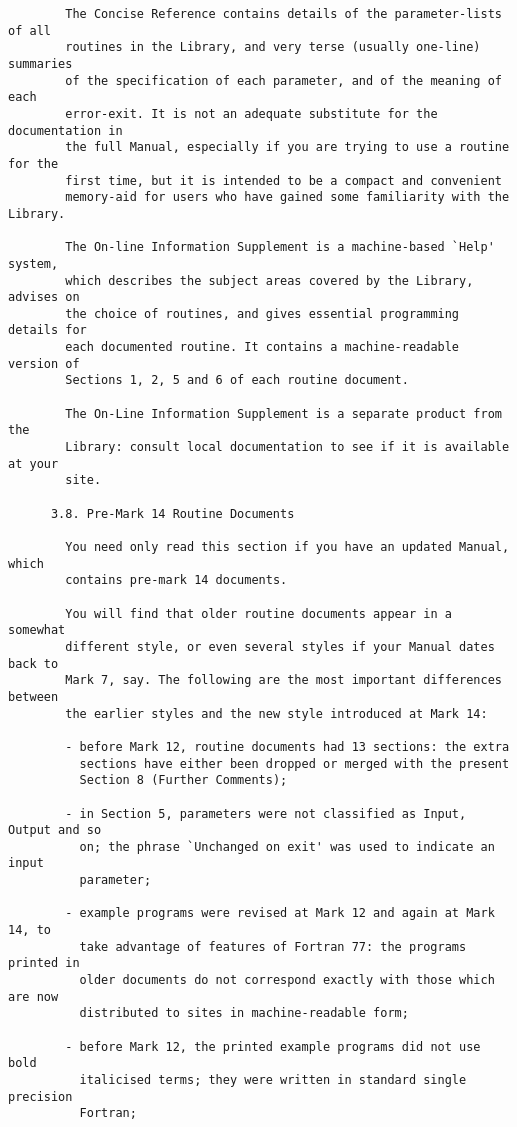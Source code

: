 \begin{small}
\begin{verbatim}
        The Concise Reference contains details of the parameter-lists of all
        routines in the Library, and very terse (usually one-line) summaries
        of the specification of each parameter, and of the meaning of each
        error-exit. It is not an adequate substitute for the documentation in
        the full Manual, especially if you are trying to use a routine for the
        first time, but it is intended to be a compact and convenient
        memory-aid for users who have gained some familiarity with the Library.

        The On-line Information Supplement is a machine-based `Help' system,
        which describes the subject areas covered by the Library, advises on
        the choice of routines, and gives essential programming details for
        each documented routine. It contains a machine-readable version of
        Sections 1, 2, 5 and 6 of each routine document.

        The On-Line Information Supplement is a separate product from the
        Library: consult local documentation to see if it is available at your
        site.

      3.8. Pre-Mark 14 Routine Documents

        You need only read this section if you have an updated Manual, which
        contains pre-mark 14 documents.

        You will find that older routine documents appear in a somewhat
        different style, or even several styles if your Manual dates back to
        Mark 7, say. The following are the most important differences between
        the earlier styles and the new style introduced at Mark 14:

        - before Mark 12, routine documents had 13 sections: the extra
          sections have either been dropped or merged with the present
          Section 8 (Further Comments);

        - in Section 5, parameters were not classified as Input, Output and so
          on; the phrase `Unchanged on exit' was used to indicate an input
          parameter;

        - example programs were revised at Mark 12 and again at Mark 14, to
          take advantage of features of Fortran 77: the programs printed in
          older documents do not correspond exactly with those which are now
          distributed to sites in machine-readable form;

        - before Mark 12, the printed example programs did not use bold
          italicised terms; they were written in standard single precision
          Fortran;


\end{verbatim}
\end{small}
